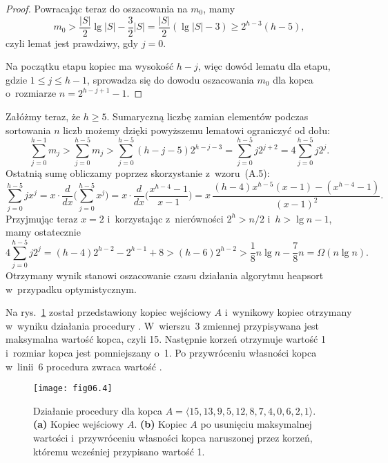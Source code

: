 \begin{proof}
Powracając teraz do oszacowania na $m_0$, mamy
\[
    m_0 > \frac{|S|}{2}\lg|S|-\frac{3}{2}|S| = \frac{|S|}{2}(\lg|S|-3) \ge 2^{h-3}(h-5),
\]
czyli lemat jest prawdziwy, gdy $j=0$.

Na początku  etapu kopiec ma wysokość $h-j$, więc dowód lematu dla  etapu, gdzie $1\le j\le h-1$, sprowadza się do dowodu oszacowania $m_0$ dla kopca o~rozmiarze $n=2^{h-j+1}-1$.
\end{proof}

Załóżmy teraz, że $h\ge5$. Sumaryczną liczbę zamian elementów podczas sortowania $n$ liczb możemy dzięki powyższemu lematowi ograniczyć od dołu:
\[
    \sum_{j=0}^{h-1}m_j > \sum_{j=0}^{h-5}m_j > \sum_{j=0}^{h-5}(h-j-5)2^{h-j-3} = \sum_{j=0}^{h-5}j2^{j+2} = 4\sum_{j=0}^{h-5}j2^j.
\]
Ostatnią sumę obliczamy poprzez skorzystanie z~wzoru~(A.5):
\[
    \sum_{j=0}^{h-5}jx^j = x\cdot\frac{d}{dx}\biggl(\sum_{j=0}^{h-5}x^j\biggr) = x\cdot\frac{d}{dx}\biggl(\frac{x^{h-4}-1}{x-1}\biggr) = x\,\frac{(h-4)x^{h-5}(x-1)-(x^{h-4}-1)}{(x-1)^2}.
\]
Przyjmując teraz $x=2$ i~korzystając z~nierówności $2^h>n/2$ i~$h>\lg n-1$, mamy ostatecznie
\[
    4\sum_{j=0}^{h-5}j2^j = (h-4)2^{h-2}-2^{h-1}+8 > (h-6)2^{h-2} > \frac{1}{8}n\lg n-\frac{7}{8}n = \Omega(n\lg n).
\]
Otrzymany wynik stanowi oszacowanie czasu działania algorytmu heapsort w~przypadku optymistycznym.


\exercise %
Na rys.~\ref{fig:6.5-1} został przedstawiony kopiec wejściowy $A$ i~wynikowy kopiec otrzymany w~wyniku działania procedury . W~wierszu~3 zmiennej  przypisywana jest maksymalna wartość kopca, czyli 15. Następnie korzeń otrzymuje wartość 1 i~rozmiar kopca jest pomniejszany o~1. Po przywróceniu własności kopca w~linii~6 procedura zwraca wartość .
\begin{figure}[ht]
	\begin{center}
		\texttt{[image: fig06.4]}
	\end{center}
	\caption{Działanie procedury  dla kopca $A=\langle15,13,9,5,12,8,7,4,0,6,2,1\rangle$. {\sffamily\bfseries(a)} Kopiec wejściowy $A$. {\sffamily\bfseries(b)} Kopiec $A$ po usunięciu maksymalnej wartości i~przywróceniu własności kopca naruszonej przez korzeń, któremu wcześniej przypisano wartość 1.} \label{fig:6.5-1}
\end{figure}


